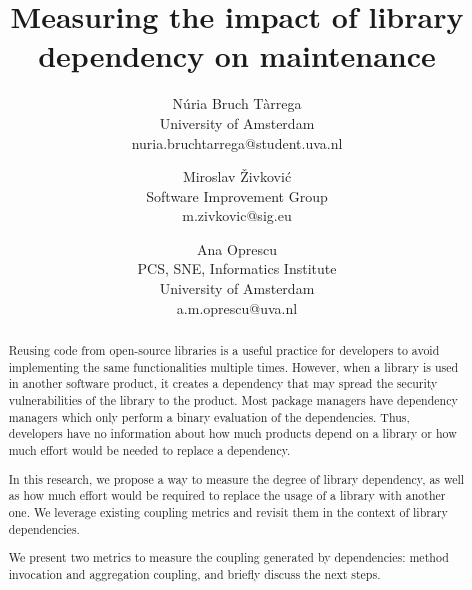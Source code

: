 \documentclass[a4paper]{article}
\title{Measuring the impact of library dependency on maintenance}
\author{
Núria Bruch Tàrrega \\ University of Amsterdam \\ nuria.bruchtarrega@student.uva.nl
\and
Miroslav \v{Z}ivkovi\'{c} \\ Software Improvement Group \\ m.zivkovic@sig.eu
\and
Ana Oprescu \\ PCS, SNE, Informatics Institute\\
                University of Amsterdam \\ a.m.oprescu@uva.nl
}
\begin{document}
\maketitle

\begin{abstract}




Reusing code from open-source libraries is a useful practice for developers to avoid implementing the same functionalities multiple times. However, when a library is used in another software product, it creates a dependency that may spread the security vulnerabilities of the library to the product. Most package managers have dependency managers which only perform a binary evaluation of the dependencies. Thus, developers have no information about how much products depend on a library or how much effort would be needed to replace a dependency.

In this research, we propose a way to measure the degree of library dependency, as well as how much effort would be required to replace the usage of a library with another one. We leverage existing coupling metrics and revisit them in the context of library dependencies.

We present two metrics to measure the coupling generated by dependencies: method invocation and aggregation coupling, and briefly discuss the next steps.

\end{abstract}
\end{document}
